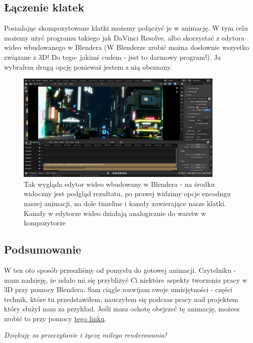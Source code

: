 \subsection{Łączenie klatek}
Posiadając skompozytowane klatki możemy połączyć je w animację. W tym celu możemy użyć programu takiego jak DaVinci Resolve, albo skorzystać z edytora wideo wbudowanego w Blendera (W Blenderze zrobić można dosłownie wszystko związane z 3D! Do tego- jakimś cudem - jest to darmowy program!). Ja wybrałem drugą opcję ponieważ jestem z nią obeznany.
\begin{figure}[hbtp]
    \centering
    \includegraphics[width=0.9\textwidth]{pictures/Tomek/video_editor.png}
    \caption{Tak wygląda edytor wideo wbudowany w Blendera - na środku widoczny jest podgląd rezultatu, po prawej widzimy opcje encodngu naszej animacji, na dole timeline i kanały zawierające nasze klatki. Kanały w edytorze wideo działają analogicznie do warstw w kompozytorze}
    \label{fig:enter-label}
\end{figure}
\subsection{Podsumowanie}
W ten oto sposób przeszliśmy od pomysłu do gotowej animacji. Czytelniku - mam nadzieję, że udało mi się przybliżyć Ci niektóre aspekty tworzenia pracy w 3D przy pomocy Blendera. Sam ciągle rozwijam swoje umiejętności - części technik, które tu przedstawiłem, nauczyłem się podczas pracy nad projektem który służył nam za przykład. Jeśli masz ochotę obejrzeć tę animację, możesz zrobić to przy pomocy \textcolor{blue}{\href{https://youtu.be/EyG5cc3As4Q}{tego linku}}. \\ %
\begin{center}
    \textit{Dziękuję za przeczytanie i życzę miłego renderowania!}
\end{center}
\newpage